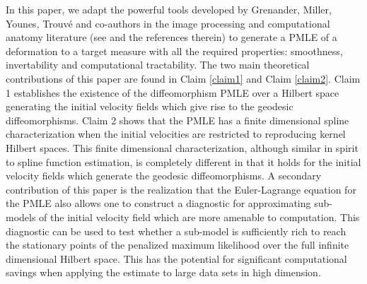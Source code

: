 \documentclass[noinfoline]{imsart}
\begin{document}
In this paper,  we adapt the powerful tools developed by Grenander, Miller,  Younes, Trouv\'e and co-authors in the image processing and computational anatomy literature   (see \cite{you:10} and the references therein) to generate a PMLE of a deformation to a target measure with all the required properties: smoothness, invertability and computational tractability.
The two main theoretical contributions of this paper are found in Claim \ref{claim1}  and Claim \ref{claim2}. Claim 1 establishes the existence of the diffeomorphism PMLE  over a Hilbert space generating the initial velocity fields which give rise to the geodesic diffeomorphisms. Claim 2 shows that the PMLE  has a finite dimensional  spline characterization  when the initial velocities are restricted to reproducing kernel Hilbert spaces.
This finite dimensional characterization, although similar in spirit to spline function estimation, is completely different in that it holds for the initial velocity fields which generate the geodesic diffeomorphisms.
  A secondary contribution of this paper is the realization that the Euler-Lagrange equation for the PMLE also allows one to construct a diagnostic for approximating sub-models of the initial velocity field which are more amenable to computation. This diagnostic can be used to test whether a sub-model is sufficiently rich to reach the stationary points of the penalized maximum likelihood over the  full infinite dimensional Hilbert space.  This has the potential for significant computational savings when applying the estimate to large data sets in high dimension.
\end{document}
